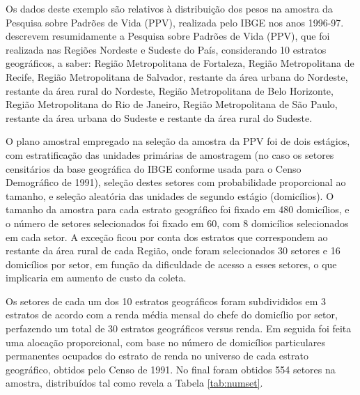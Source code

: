 \documentclass[]{book}
\theoremstyle{definition}
\theoremstyle{definition}
\theoremstyle{definition}
\theoremstyle{remark}
\begin{document}
Os dados deste exemplo são relativos à distribuição dos pesos na amostra
da Pesquisa sobre Padrões de Vida (PPV), realizada pelo IBGE nos anos
1996-97. \citep{albieri} descrevem resumidamente a Pesquisa sobre
Padrões de Vida (PPV), que foi realizada nas Regiões Nordeste e Sudeste
do País, considerando 10 estratos geográficos, a saber: Região
Metropolitana de Fortaleza, Região Metropolitana de Recife, Região
Metropolitana de Salvador, restante da área urbana do Nordeste, restante
da área rural do Nordeste, Região Metropolitana de Belo Horizonte,
Região Metropolitana do Rio de Janeiro, Região Metropolitana de São
Paulo, restante da área urbana do Sudeste e restante da área rural do
Sudeste.

O plano amostral empregado na seleção da amostra da PPV foi de dois
estágios, com estratificação das unidades primárias de amostragem (no
caso os setores censitários da base geográfica do IBGE conforme usada
para o Censo Demográfico de 1991), seleção destes setores com
probabilidade proporcional ao tamanho, e seleção aleatória das unidades
de segundo estágio (domicílios). O tamanho da amostra para cada estrato
geográfico foi fixado em 480 domicílios, e o número de setores
selecionados foi fixado em 60, com 8 domicílios selecionados em cada
setor. A exceção ficou por conta dos estratos que correspondem ao
restante da área rural de cada Região, onde foram selecionados 30
setores e 16 domicílios por setor, em função da dificuldade de acesso a
esses setores, o que implicaria em aumento de custo da coleta.

Os setores de cada um dos 10 estratos geográficos foram subdivididos em
3 estratos de acordo com a renda média mensal do chefe do domicílio por
setor, perfazendo um total de 30 estratos geográficos versus renda. Em
seguida foi feita uma alocação proporcional, com base no número de
domicílios particulares permanentes ocupados do estrato de renda no
universo de cada estrato geográfico, obtidos pelo Censo de 1991. No
final foram obtidos 554 setores na amostra, distribuídos tal como revela
a Tabela \ref{tab:numset}.
\end{document}
